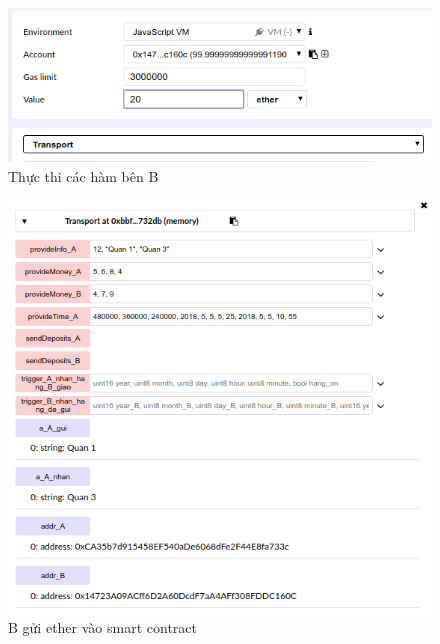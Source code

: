 \begin{figure}[tph]
	\centering
	\includegraphics[width=14cm]{snapshot/8.png}
	\vspace{0.3cm}
	\caption{Thực thi các hàm bên B}
	\label{fig:fig8}
\end{figure}

\begin{figure}[tph]
	\centering
	\includegraphics[width=14cm]{snapshot/9.png}
	\vspace{0.3cm}
	\caption{B gửi ether vào smart contract}
	\label{fig:fig9}
\end{figure}

